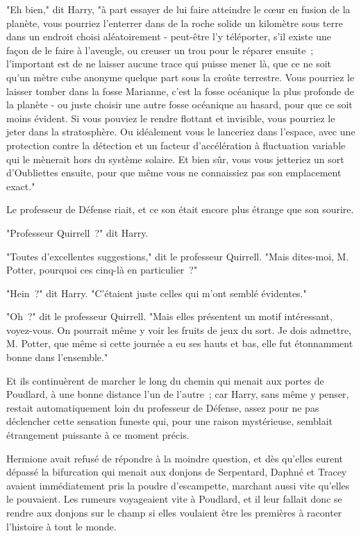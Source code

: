 "Eh bien," dit Harry, "à part essayer de lui faire atteindre le cœur en fusion de la planète, vous pourriez l'enterrer dans de la roche solide un kilomètre sous terre dans un endroit choisi aléatoirement - peut-être l'y téléporter, s'il existe une façon de le faire à l'aveugle, ou creuser un trou pour le réparer ensuite~; l'important est de ne laisser aucune trace qui puisse mener là, que ce ne soit qu'un mètre cube anonyme quelque part sous la croûte terrestre. Vous pourriez le laisser tomber dans la fosse Marianne, c'est la fosse océanique la plus profonde de la planète - ou juste choisir une autre fosse océanique au hasard, pour que ce soit moins évident. Si vous pouviez le rendre flottant et invisible, vous pourriez le jeter dans la stratosphère. Ou idéalement vous le lanceriez dans l'espace, avec une protection contre la détection et un facteur d'accélération à fluctuation variable qui le mènerait hors du système solaire. Et bien sûr, vous vous jetteriez un sort d'Oubliettes ensuite, pour que même vous ne connaissiez pas son emplacement exact."

Le professeur de Défense riait, et ce son était encore plus étrange que son sourire.

"Professeur Quirrell~?" dit Harry.

"Toutes d'excellentes suggestions," dit le professeur Quirrell. "Mais dites-moi, M. Potter, pourquoi ces cinq-là en particulier~?"

"Hein~?" dit Harry. "C'étaient juste celles qui m'ont semblé évidentes."

"Oh~?" dit le professeur Quirrell. "Mais elles présentent un motif intéressant, voyez-vous. On pourrait même y voir les fruits de jeux du sort. Je dois admettre, M. Potter, que même si cette journée a eu ses hauts et bas, elle fut étonnamment bonne dans l'ensemble."

Et ils continuèrent de marcher le long du chemin qui menait aux portes de Poudlard, à une bonne distance l'un de l'autre~; car Harry, sans même y penser, restait automatiquement loin du professeur de Défense, assez pour ne pas déclencher cette sensation funeste qui, pour une raison mystérieuse, semblait étrangement puissante à ce moment précis.


Hermione avait refusé de répondre à la moindre question, et dès qu'elles eurent dépassé la bifurcation qui menait aux donjons de Serpentard, Daphné et Tracey avaient immédiatement pris la poudre d'escampette, marchant aussi vite qu'elles le pouvaient. Les rumeurs voyageaient vite à Poudlard, et il leur fallait donc se rendre aux donjons sur le champ si elles voulaient être les premières à raconter l'histoire à tout le monde.

